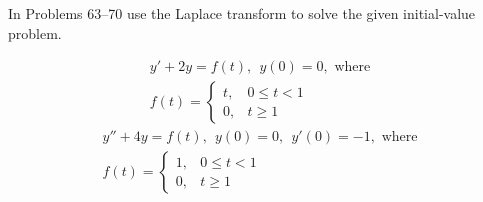 \documentclass[chapter=7,section=3]{math252homework}
\begin{document}
In Problems 63--70 use the Laplace transform to solve the given initial-value problem.
\begin{problems}[start=65]
	\problem \begin{equation*}
	\begin{aligned}
		y' + 2y = f(t),\ \ y(0) = 0, \mbox{ where}\\f(t) = \left\{ \begin{array}{cr}
		t, & 0 \leq t < 1\\
		0, & t \geq 1
	\end{array} \right.
	\end{aligned}
	\end{equation*}			%
	\problem \begin{equation*}
	\begin{aligned}
		y'' + 4y = f(t),\ \ y(0) = 0,\ \ y'(0) = -1, \mbox{ where}\\f(t) = \left\{ \begin{array}{cr}
		1, & 0 \leq t < 1\\
		0, & t \geq 1
	\end{array} \right.
	\end{aligned}
	\end{equation*}			%
\end{problems}
\end{document}
